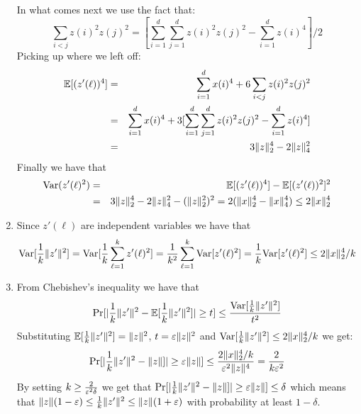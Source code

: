 \documentclass{article}
\begin{document}
\begin{enumerate}
In what comes next we use the fact that:
\[
\sum_{i<j}z(i)^2 z(j)^2 = [\sum_{i=1}^{d}\sum_{j=1}^{d}z(i)^2 z(j)^2 -  \sum_{i=1}^{d}z(i)^4]/2
\]
Picking up where we left off:
\begin{eqnarray*}
{\mathbb E}[(z'(\ell))^4] &=& \sum_{i=1}^{d}x(i)^4 + 6 \sum_{i<j}z(i)^2 z(j)^2\\
&=& \sum_{i=1}^{d}x(i)^4 + 3[\sum_{i=1}^{d}\sum_{j=1}^{d}z(i)^2 z(j)^2 -  \sum_{i=1}^{d}z(i)^4] \\
&=& 3\|z\|_{2}^{4} - 2\|z\|_4^2 
\end{eqnarray*}
Finally we have that 
\begin{eqnarray*}
{\operatorname{Var}}( z'(\ell)^2) &=& {\mathbb E}[(z'(\ell))^4]  -{\mathbb E}[(z'(\ell))^2]^2 \\
&=& 3\|z\|_{2}^{4} - 2\|z\|_4^2 - (\|z\|_{2}^{2})^2 = 2(\|x\|_2^4 - \|x\|_4^4) \le 2\|x\|_2^4 
\end{eqnarray*}
\item Since $z'(\ell)$ are independent variables we have that 
\[
{\operatorname{Var}}[\frac{1}{k}\|z'\|^2] = {\operatorname{Var}}[\frac{1}{k} \sum_{\ell=1}^{k}z'(\ell)^2] =  \frac{1}{k^2}\sum_{\ell=1}^{k}{\operatorname{Var}}[z'(\ell)^2] = \frac{1}{k}{\operatorname{Var}}[z'(\ell)^2] \le 2\|x\|_2^4/k
\]
\item From Chebishev's inequality we have that 
\[
\Pr[|\frac{1}{k}\|z'\|^2 - {\mathbb E}[\frac{1}{k}\|z'\|^2]| \ge t] \le \frac{{\operatorname{Var}}[\frac{1}{k}\|z'\|^2]}{t^2}
\]
Substituting ${\mathbb E}[\frac{1}{k}\|z'\|^2] = \|z\|^2$, $t = \varepsilon\|z\|^2$ and ${\operatorname{Var}}[\frac{1}{k}\|z'\|^2] \le 2\|x\|_2^4/k$ we get:
\[
\Pr[|\frac{1}{k}\|z'\|^2 - \|z\|]| \ge \varepsilon \|z\|] \le \frac{2\|x\|_2^4/k}{\varepsilon^2\|z\|^4} = \frac{2}{k\varepsilon^2} 
\]
By setting $k \ge \frac{2}{\varepsilon^2 \delta}$ we get that $\Pr[|\frac{1}{k}\|z'\|^2 - \|z\|]| \ge \varepsilon \|z\|] \le \delta$ which means that
$\|z\|(1-\varepsilon)\le \frac{1}{k}\|z'\|^2 \le \|z\|(1+\varepsilon)$ with probability at least $1-\delta$.
\end{enumerate}
\end{document}
